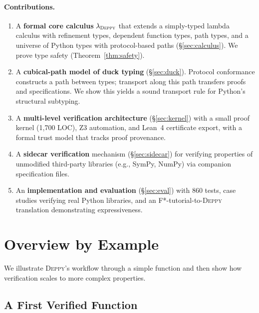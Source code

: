 \documentclass[acmsmall,nonacm,screen]{acmart}
\newcommand{\deppy}{\textsc{Deppy}}
\begin{document}
\paragraph{Contributions.}
\begin{enumerate}
\item A \textbf{formal core calculus} $\lambda_{\deppy}$ that extends a
  simply-typed lambda calculus with refinement types, dependent
  function types, path types, and a universe of Python types with
  protocol-based paths (\S\ref{sec:calculus}).  We prove type safety
  (Theorem~\ref{thm:safety}).

\item A \textbf{cubical-path model of duck typing}
  (\S\ref{sec:duck}).  Protocol conformance constructs a path between
  types; transport along this path transfers proofs and specifications.
  We show this yields a sound transport rule for Python's structural
  subtyping.

\item A \textbf{multi-level verification architecture}
  (\S\ref{sec:kernel}) with a small proof kernel (1,700 LOC), Z3
  automation, and Lean~4 certificate export, with a formal trust model
  that tracks proof provenance.

\item A \textbf{sidecar verification} mechanism
  (\S\ref{sec:sidecar}) for verifying properties of unmodified
  third-party libraries (e.g., SymPy, NumPy) via companion
  specification files.

\item An \textbf{implementation and evaluation} (\S\ref{sec:eval})
  with 860 tests, case studies verifying real Python libraries, and an
  F*-tutorial-to-\deppy{} translation demonstrating expressiveness.
\end{enumerate}



\section{Overview by Example}\label{sec:overview}

We illustrate \deppy{}'s workflow through a simple function and then
show how verification scales to more complex properties.

\subsection{A First Verified Function}
\end{document}
